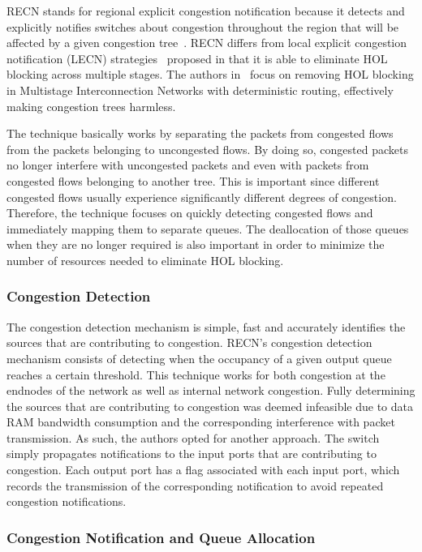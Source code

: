 \documentclass[12pt]{article}
\begin{document}
RECN stands for regional explicit congestion notification because it detects and explicitly notifies switches about congestion throughout the region that will be affected by a given congestion tree~\cite{paper2}. RECN differs from local explicit congestion notification (LECN) strategies~\cite{KM04} proposed in that it is able to eliminate HOL blocking across multiple stages. The authors in~\cite{paper2} focus on removing HOL blocking in Multistage Interconnection Networks with deterministic routing, effectively making congestion trees harmless. 

The technique basically works by separating the packets from congested flows from the packets belonging to uncongested flows. By doing so, congested packets no longer interfere with uncongested packets and even with packets from congested flows belonging to another tree. This is important since different congested flows usually experience significantly different degrees of congestion. Therefore, the technique focuses on quickly detecting congested flows and immediately mapping them to separate queues. The deallocation of those queues when they are no longer required is also important in order to minimize the number of resources needed to eliminate HOL blocking.

\subsubsection{Congestion Detection}

The congestion detection mechanism is simple, fast and accurately identifies the sources that are contributing to congestion. RECN's congestion detection mechanism consists of detecting when the occupancy of a given output queue reaches a certain threshold. This technique works for both congestion at the endnodes of the network as well as internal network congestion. Fully determining the sources that are contributing to congestion was deemed infeasible due to data RAM bandwidth consumption and the corresponding interference with packet transmission. As such, the authors opted for another approach. The switch simply propagates notifications to the input ports that are contributing to congestion. Each output port has a flag associated with each input port, which records the transmission of the corresponding notification to avoid repeated congestion notifications.

\subsubsection{Congestion Notification and Queue Allocation}
\end{document}
